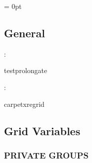 \parskip = 0pt

\vspace{3mm} \subsection*{General}

: 

testprolongate
\vspace{2mm}

: 

carpetxregrid
\vspace{2mm}
\subsection*{Grid Variables}
\vspace{5mm}\subsubsection{PRIVATE GROUPS}

\vspace{5mm}

